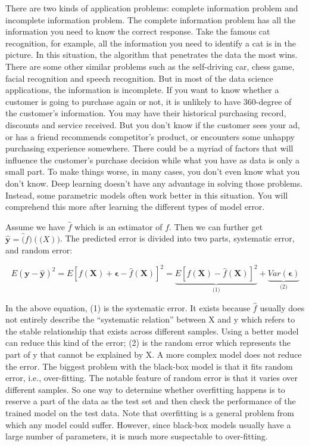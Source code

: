 \documentclass[12pt,]{krantz}
\theoremstyle{definition}
\theoremstyle{definition}
\theoremstyle{remark}
\begin{document}
There are two kinds of application problems: complete information
problem and incomplete information problem. The complete information
problem has all the information you need to know the correct response.
Take the famous cat recognition, for example, all the information you
need to identify a cat is in the picture. In this situation, the
algorithm that penetrates the data the most wins. There are some other
similar problems such as the self-driving car, chess game, facial
recognition and speech recognition. But in most of the data science
applications, the information is incomplete. If you want to know whether
a customer is going to purchase again or not, it is unlikely to have
360-degree of the customer's information. You may have their historical
purchasing record, discounts and service received. But you don't know if
the customer sees your ad, or has a friend recommends competitor's
product, or encounters some unhappy purchasing experience somewhere.
There could be a myriad of factors that will influence the customer's
purchase decision while what you have as data is only a small part. To
make things worse, in many cases, you don't even know what you don't
know. Deep learning doesn't have any advantage in solving those
problems. Instead, some parametric models often work better in this
situation. You will comprehend this more after learning the different
types of model error.

Assume we have \(\hat{f}\) which is an estimator of \(f\). Then we can
further get \(\mathbf{\hat{y}}=\hat(f)(\mathbf(X))\). The predicted
error is divided into two parts, systematic error, and random error:

\[E(\mathbf{y}-\hat{\mathbf{y}})^{2}=E[f(\mathbf{X})+\mathbf{\epsilon}-\hat{f}(\mathbf{X})]^{2}=\underset{\text{(1)}}{\underbrace{E[f(\mathbf{X})-\hat{f}(\mathbf{X})]^{2}}}+\underset{\text{(2)}}{\underbrace{Var(\mathbf{\epsilon})}}
\label{eq:error}\]

In the above equation, (1) is the systematic error. It exists because
\(\hat{f}\) usually does not entirely describe the ``systematic
relation'' between X and y which refers to the stable relationship that
exists across different samples. Using a better model can reduce this
kind of the error; (2) is the random error which represents the part of
y that cannot be explained by X. A more complex model does not reduce
the error. The biggest problem with the black-box model is that it fits
random error, i.e., over-fitting. The notable feature of random error is
that it varies over different samples. So one way to determine whether
overfitting happens is to reserve a part of the data as the test set and
then check the performance of the trained model on the test data. Note
that overfitting is a general problem from which any model could suffer.
However, since black-box models usually have a large number of
parameters, it is much more suspectable to over-fitting.
\end{document}
